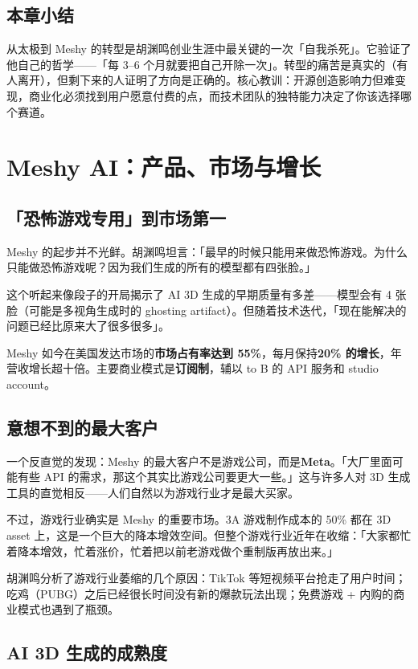 \documentclass[a4paper]{article}
\begin{document}
\subsection{本章小结}
从太极到 Meshy 的转型是胡渊鸣创业生涯中最关键的一次「自我杀死」。它验证了他自己的哲学——「每 3--6 个月就要把自己开除一次」。转型的痛苦是真实的（有人离开），但剩下来的人证明了方向是正确的。核心教训：开源创造影响力但难变现，商业化必须找到用户愿意付费的点，而技术团队的独特能力决定了你该选择哪个赛道。

\section{Meshy AI：产品、市场与增长}

\subsection{「恐怖游戏专用」到市场第一}

Meshy 的起步并不光鲜。胡渊鸣坦言：「最早的时候只能用来做恐怖游戏。为什么只能做恐怖游戏呢？因为我们生成的所有的模型都有四张脸。」

这个听起来像段子的开局揭示了 AI 3D 生成的早期质量有多差——模型会有 4 张脸（可能是多视角生成时的 ghosting artifact）。但随着技术迭代，「现在能解决的问题已经比原来大了很多很多」。

Meshy 如今在美国发达市场的\textbf{市场占有率达到 55\%}，每月保持\textbf{20\% 的增长}，年营收增长超十倍。主要商业模式是\textbf{订阅制}，辅以 to B 的 API 服务和 studio account。

\subsection{意想不到的最大客户}

一个反直觉的发现：Meshy 的最大客户不是游戏公司，而是\textbf{Meta}。「大厂里面可能有些 API 的需求，那这个其实比游戏公司要更大一些。」这与许多人对 3D 生成工具的直觉相反——人们自然以为游戏行业才是最大买家。

不过，游戏行业确实是 Meshy 的重要市场。3A 游戏制作成本的 50\% 都在 3D asset 上，这是一个巨大的降本增效空间。但整个游戏行业近年在收缩：「大家都忙着降本增效，忙着涨价，忙着把以前老游戏做个重制版再放出来。」

胡渊鸣分析了游戏行业萎缩的几个原因：TikTok 等短视频平台抢走了用户时间；吃鸡（PUBG）之后已经很长时间没有新的爆款玩法出现；免费游戏 + 内购的商业模式也遇到了瓶颈。

\subsection{AI 3D 生成的成熟度}
\end{document}
